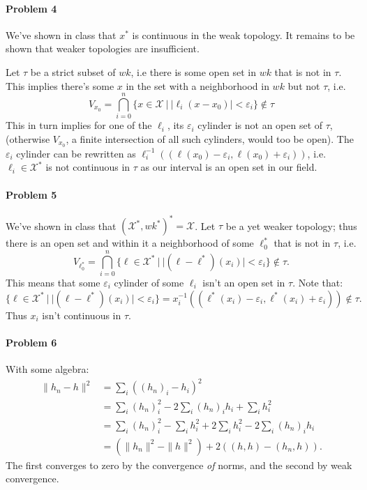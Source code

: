 \documentclass[12pt]{article}
\newcommand{\X}{\mathcal{X}}
\begin{document}
\paragraph{Problem 4}

We've shown in class that $x^*$ is continuous in the weak topology. It remains
to be shown that weaker topologies are insufficient.

Let $\tau$ be a strict subset of $wk$, i.e there is some open set in $wk$ that
is not in $\tau$. This implies there's some $x$ in the set with a
neighborhood in $wk$ but not $\tau$, i.e.
\begin{displaymath}
  V_{x_0} = \bigcap_{i=0}^n\{x\in\X\ |\ |\ell_i(x-x_0)|<\varepsilon_i\}\notin\tau 
\end{displaymath}
This in turn implies for one of the $\ell_i$, its $\varepsilon_i$ cylinder is
not an open set of $\tau$, (otherwise $V_{x_0}$, a finite intersection of all
such cylinders, would too be open). The $\varepsilon_i$ cylinder can be
rewritten as $\ell_i^{-1}((\ell(x_0)-\varepsilon_i, \ell(x_0)+\varepsilon_i))$,
i.e. $\ell_i\in \X^*$ is not continuous in $\tau$ as our interval is an open
set in our field.

\paragraph{Problem 5}

We've shown in class that $(\X^*,wk^*)^* = \X$. Let $\tau$ be a yet weaker
topology; thus there is an open set and within it a neighborhood of some
$\ell_0^*$ that is not in $\tau$, i.e.
\begin{displaymath}
  V_{\ell_0^*} = \bigcap_{i=0}^n\{\ell\in\X^*\ |\ |(\ell-\ell^*)(x_i)| <\varepsilon_i
  \} \notin\tau.
\end{displaymath}
This means that some $\varepsilon_i$ cylinder of some $\ell_i$ isn't an open
set in $\tau$. Note that:
\begin{displaymath}
  \{\ell\in\X^*\ |\ |(\ell-\ell^*)(x_i)|<\varepsilon_i\}
  = x_i^{-1}((\ell^*(x_i)-\varepsilon_i,\ell^*(x_i)+\varepsilon_i))\notin\tau.
\end{displaymath}
Thus $x_i$ isn't continuous in $\tau$.

\paragraph{Problem 6}

With some algebra:
\begin{align*}
  \|h_n-h\|^2
  &= \sum_i((h_n)_i-h_i)^2\\
  &= \sum_i(h_n)_i^2 - 2\sum_i(h_n)_ih_i + \sum_ih_i^2\\
  &= \sum_i(h_n)_i^2 - \sum_ih_i^2 + 2\sum_ih_i^2 - 2\sum_i(h_n)_ih_i\\
  &= (\|h_n\|^2 - \|h\|^2) + 2((h,h) - (h_n,h)).
\end{align*}
The first converges to zero by the convergence \emph{of} norms, and the second by
weak convergence.
\end{document}
